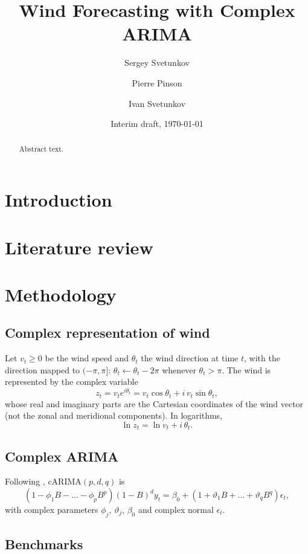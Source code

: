 \documentclass[11pt]{article}
\title{Wind Forecasting with Complex ARIMA}
\author{Sergey Svetunkov \and Pierre Pinson \and Ivan Svetunkov}
\date{Interim draft, \today}
\begin{document}
\maketitle

\begin{abstract}
Abstract text.
\end{abstract}

\section{Introduction}

\section{Literature review}

\section{Methodology}
\subsection{Complex representation of wind}
Let $v_t \ge 0$ be the wind speed and $\theta_t$ the wind direction at time $t$, with the
direction mapped to $(-\pi, \pi]$: $\theta_t \leftarrow \theta_t - 2\pi$ whenever $\theta_t > \pi$.
The wind is represented by the complex variable
\begin{equation}
  z_t = v_t e^{i\theta_t} = v_t \cos\theta_t + i\, v_t \sin\theta_t ,
\end{equation}
whose real and imaginary parts are the Cartesian coordinates of the wind vector
(not the zonal and meridional components). In logarithms,
\begin{equation}
  \ln z_t = \ln v_t + i\,\theta_t .
\end{equation}

\subsection{Complex ARIMA}
Following \citet{Svetunkov2024}, cARIMA$(p,d,q)$ is
\begin{equation}
  (1-\phi_1 B-\dots-\phi_p B^p)(1-B)^d y_t = \beta_0 + (1+\vartheta_1 B+\dots+\vartheta_q B^q)\epsilon_t ,
\end{equation}
with complex parameters $\phi_j$, $\vartheta_j$, $\beta_0$ and complex normal $\epsilon_t$.

\subsection{Benchmarks}
\end{document}
